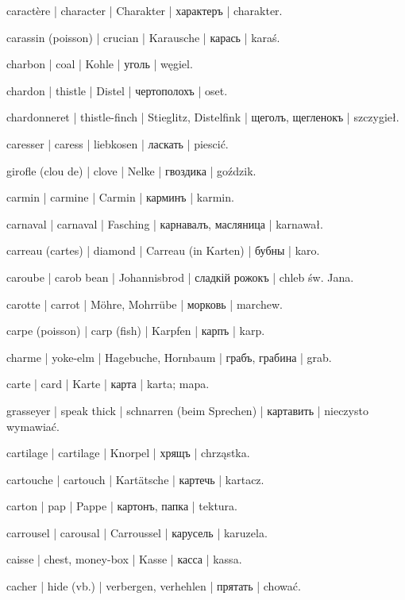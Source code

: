 \begin{outdent}{1em}
caractère | character | Charakter | характеръ | charakter.

carassin (poisson) | crucian | Karausche | карась | karaś.

charbon | coal | Kohle | уголь | węgiel.

chardon | thistle | Distel | чертополохъ | oset.

chardonneret | thistle-finch | Stieglitz, Distelfink | щеголъ, щегленокъ | szczygieł.

caresser | caress | liebkosen | ласкать | piescić.

girofle (clou de) | clove | Nelke | гвоздика | goździk.

carmin | carmine | Carmin | карминъ | karmin.

carnaval | carnaval | Fasching | карнавалъ, масляница | karnawał.

carreau (cartes) | diamond | Carreau (in Karten) | бубны | karo.

caroube | carob bean | Johannisbrod | сладкій рожокъ | chleb św. Jana.

carotte | carrot | Möhre, Mohrrübe | морковь | marchew.

carpe (poisson) | carp (fish) | Karpfen | карпъ | karp.

charme | yoke-elm | Hagebuche, Hornbaum | грабъ, грабина | grab.

carte | card | Karte | карта | karta; mapa.

grasseyer | speak thick | schnarren (beim Sprechen) | картавить | nieczysto wymawiać.

cartilage | cartilage | Knorpel | хрящъ | chrząstka.

cartouche | cartouch | Kartätsche | картечь | kartacz.

carton | pap | Pappe | картонъ, папка | tektura.

carrousel | carousal | Carroussel | карусель | karuzela.

caisse | chest, money-box | Kasse | касса | kassa.

cacher | hide (vb.) | verbergen, verhehlen | прятать | chować.


\end{outdent}
